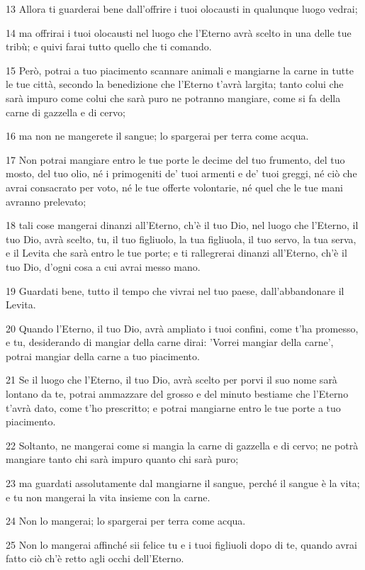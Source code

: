 \par 13 Allora ti guarderai bene dall'offrire i tuoi olocausti in qualunque luogo vedrai;
\par 14 ma offrirai i tuoi olocausti nel luogo che l'Eterno avrà scelto in una delle tue tribù; e quivi farai tutto quello che ti comando.
\par 15 Però, potrai a tuo piacimento scannare animali e mangiarne la carne in tutte le tue città, secondo la benedizione che l'Eterno t'avrà largita; tanto colui che sarà impuro come colui che sarà puro ne potranno mangiare, come si fa della carne di gazzella e di cervo;
\par 16 ma non ne mangerete il sangue; lo spargerai per terra come acqua.
\par 17 Non potrai mangiare entro le tue porte le decime del tuo frumento, del tuo mosto, del tuo olio, né i primogeniti de' tuoi armenti e de' tuoi greggi, né ciò che avrai consacrato per voto, né le tue offerte volontarie, né quel che le tue mani avranno prelevato;
\par 18 tali cose mangerai dinanzi all'Eterno, ch'è il tuo Dio, nel luogo che l'Eterno, il tuo Dio, avrà scelto, tu, il tuo figliuolo, la tua figliuola, il tuo servo, la tua serva, e il Levita che sarà entro le tue porte; e ti rallegrerai dinanzi all'Eterno, ch'è il tuo Dio, d'ogni cosa a cui avrai messo mano.
\par 19 Guardati bene, tutto il tempo che vivrai nel tuo paese, dall'abbandonare il Levita.
\par 20 Quando l'Eterno, il tuo Dio, avrà ampliato i tuoi confini, come t'ha promesso, e tu, desiderando di mangiar della carne dirai: 'Vorrei mangiar della carne', potrai mangiar della carne a tuo piacimento.
\par 21 Se il luogo che l'Eterno, il tuo Dio, avrà scelto per porvi il suo nome sarà lontano da te, potrai ammazzare del grosso e del minuto bestiame che l'Eterno t'avrà dato, come t'ho prescritto; e potrai mangiarne entro le tue porte a tuo piacimento.
\par 22 Soltanto, ne mangerai come si mangia la carne di gazzella e di cervo; ne potrà mangiare tanto chi sarà impuro quanto chi sarà puro;
\par 23 ma guardati assolutamente dal mangiarne il sangue, perché il sangue è la vita; e tu non mangerai la vita insieme con la carne.
\par 24 Non lo mangerai; lo spargerai per terra come acqua.
\par 25 Non lo mangerai affinché sii felice tu e i tuoi figliuoli dopo di te, quando avrai fatto ciò ch'è retto agli occhi dell'Eterno.
